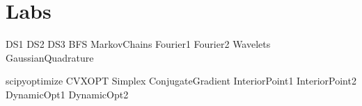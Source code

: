 \documentclass[nociteref]{SIAM-GH-book}
\begin{document}
\part{Labs} %
{DS1}
{DS2}
{DS3}
{BFS}
{MarkovChains}
{Fourier1}
{Fourier2}
{Wavelets}
{GaussianQuadrature}

{scipyoptimize}
{CVXOPT}
{Simplex}
{ConjugateGradient}
{InteriorPoint1}
{InteriorPoint2}
{DynamicOpt1}
{DynamicOpt2}
\end{document}
